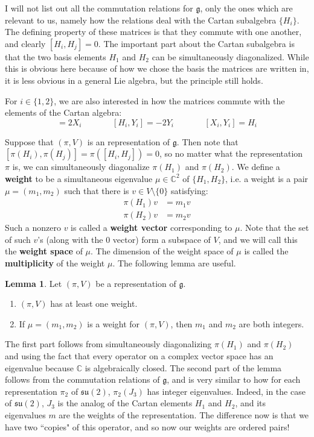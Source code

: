 \documentclass[11pt, oneside]{article}   	%
\theoremstyle{definition}
\newtheorem{lemma}[theorem]{Lemma}
\begin{document}
I will not list out all the commutation relations for $\mathfrak{g}$, only the ones which are relevant to us, namely 
how the relations deal with the Cartan subalgebra $\{H_i\}$. The defining property of these matrices is that they commute with 
one another, and clearly $[H_i, H_j] = 0$. The important part about the Cartan subalgebra is that the two basis elements 
$H_1$ and $H_2$ can be simultaneously diagonalized. While this is obvious here because of how we chose the basis the 
matrices are written in, it is less obvious in a general Lie algebra, but the principle still holds.

For $i\in\{1, 2\}$, we are also interested in how the matrices commute with the elements of the Cartan algebra:
\begin{equation}
	[H_i, X_i] = 2X_i\;\;\;\;\;\;\;\;\;\;\;\;\; [H_i, Y_i] = -2Y_i \;\;\;\;\;\;\;\;\;\;\;\;\; [X_i, Y_i] = H_i
\end{equation}

Suppose that $(\pi, V)$ is an representation of $\mathfrak g$. Then note that $[\pi(H_i), \pi(H_j)] = \pi([H_i, H_j]) = 0$, so 
no matter what the representation $\pi$ is, we can simultaneously diagonalize $\pi(H_1)$ and $\pi(H_2)$. We define 
a \textbf{weight} to be a simultaneous eigenvalue $\mu\in\mathbb C^2$ of $\{H_1, H_2\}$, i.e. a weight is a pair 
$\mu = (m_1, m_2)$ such that there is $v\in V\setminus\{0\}$ satisfying:
\begin{align}
	\pi(H_1) v &= m_1 v \\
	\pi(H_2) v &= m_2 v
\end{align}
Such a nonzero $v$ is called a \textbf{weight vector} corresponding to $\mu$. Note that the set of such $v$'s (along with 
the $0$ vector) form a subspace of $V$, and we will call this the \textbf{weight space} of $\mu$. The dimension of the weight 
space of $\mu$ is called the \textbf{multiplicity} of the weight $\mu$. The following lemma are useful.
\begin{lemma}
	Let $(\pi, V)$ be a representation of $\mathfrak g$. 
	\begin{enumerate}
		\item $(\pi, V)$ has at least one weight.
		\item If $\mu = (m_1, m_2)$ is a weight for $(\pi, V)$, then $m_1$ and $m_2$ are both integers.
	\end{enumerate}
\end{lemma}
The first part follows from simultaneously diagonalizing $\pi(H_1)$ and $\pi(H_2)$ and using the fact that every operator on 
a complex vector space has an eigenvalue because $\mathbb C$ is algebraically closed. The second part of the lemma 
follows from the commutation relations of $\mathfrak g$, and is very similar to how for each representation $\pi_2$ of 
$\mathfrak{su}(2)$, $\pi_2(J_3)$ has integer eigenvalues. Indeed, in the case of $\mathfrak{su}(2)$, $J_3$ is the analog 
of the Cartan elements $H_1$ and $H_2$, and its eigenvalues $m$ are the weights of the representation. The difference now 
is that we have two ``copies" of this operator, and so now our weights are ordered pairs!
\end{document}
